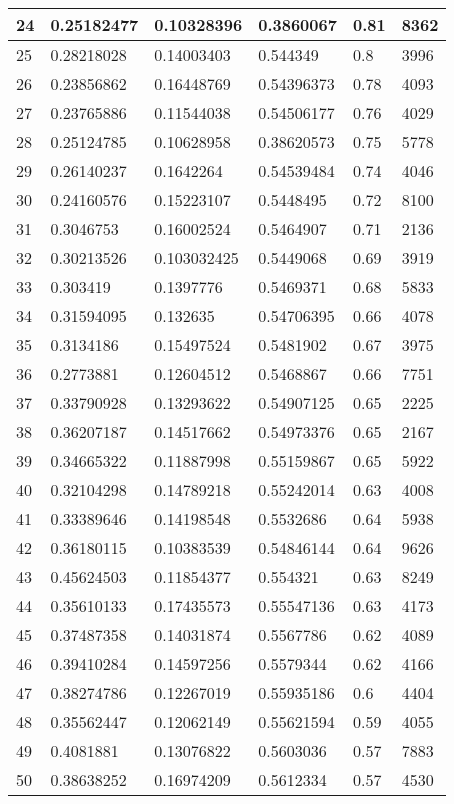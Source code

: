 \begin{longtable}{|l|l|l|l|l|l|}
24 & 0.25182477 & 0.10328396 & 0.3860067 & 0.81 & 8362 \\ \hline 
25 & 0.28218028 & 0.14003403 & 0.544349 & 0.8 & 3996 \\ \hline 
26 & 0.23856862 & 0.16448769 & 0.54396373 & 0.78 & 4093 \\ \hline 
27 & 0.23765886 & 0.11544038 & 0.54506177 & 0.76 & 4029 \\ \hline 
28 & 0.25124785 & 0.10628958 & 0.38620573 & 0.75 & 5778 \\ \hline 
29 & 0.26140237 & 0.1642264 & 0.54539484 & 0.74 & 4046 \\ \hline 
30 & 0.24160576 & 0.15223107 & 0.5448495 & 0.72 & 8100 \\ \hline 
31 & 0.3046753 & 0.16002524 & 0.5464907 & 0.71 & 2136 \\ \hline 
32 & 0.30213526 & 0.103032425 & 0.5449068 & 0.69 & 3919 \\ \hline 
33 & 0.303419 & 0.1397776 & 0.5469371 & 0.68 & 5833 \\ \hline 
34 & 0.31594095 & 0.132635 & 0.54706395 & 0.66 & 4078 \\ \hline 
35 & 0.3134186 & 0.15497524 & 0.5481902 & 0.67 & 3975 \\ \hline 
36 & 0.2773881 & 0.12604512 & 0.5468867 & 0.66 & 7751 \\ \hline 
37 & 0.33790928 & 0.13293622 & 0.54907125 & 0.65 & 2225 \\ \hline 
38 & 0.36207187 & 0.14517662 & 0.54973376 & 0.65 & 2167 \\ \hline 
39 & 0.34665322 & 0.11887998 & 0.55159867 & 0.65 & 5922 \\ \hline 
40 & 0.32104298 & 0.14789218 & 0.55242014 & 0.63 & 4008 \\ \hline 
41 & 0.33389646 & 0.14198548 & 0.5532686 & 0.64 & 5938 \\ \hline 
42 & 0.36180115 & 0.10383539 & 0.54846144 & 0.64 & 9626 \\ \hline 
43 & 0.45624503 & 0.11854377 & 0.554321 & 0.63 & 8249 \\ \hline 
44 & 0.35610133 & 0.17435573 & 0.55547136 & 0.63 & 4173 \\ \hline 
45 & 0.37487358 & 0.14031874 & 0.5567786 & 0.62 & 4089 \\ \hline 
46 & 0.39410284 & 0.14597256 & 0.5579344 & 0.62 & 4166 \\ \hline 
47 & 0.38274786 & 0.12267019 & 0.55935186 & 0.6 & 4404 \\ \hline 
48 & 0.35562447 & 0.12062149 & 0.55621594 & 0.59 & 4055 \\ \hline 
49 & 0.4081881 & 0.13076822 & 0.5603036 & 0.57 & 7883 \\ \hline 
50 & 0.38638252 & 0.16974209 & 0.5612334 & 0.57 & 4530 \\ \hline 
\end{longtable}